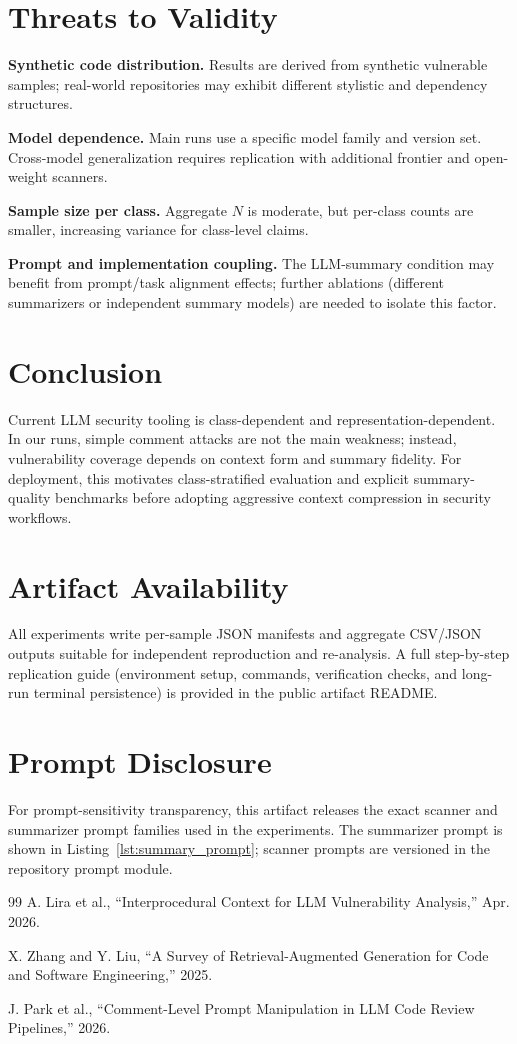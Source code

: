 \documentclass[conference]{IEEEtran}
\begin{document}
\section{Threats to Validity}
\textbf{Synthetic code distribution.} Results are derived from synthetic vulnerable samples; real-world repositories may exhibit different stylistic and dependency structures.

\textbf{Model dependence.} Main runs use a specific model family and version set. Cross-model generalization requires replication with additional frontier and open-weight scanners.

\textbf{Sample size per class.} Aggregate \(N\) is moderate, but per-class counts are smaller, increasing variance for class-level claims.

\textbf{Prompt and implementation coupling.} The LLM-summary condition may benefit from prompt/task alignment effects; further ablations (different summarizers or independent summary models) are needed to isolate this factor.

\section{Conclusion}
Current LLM security tooling is class-dependent and representation-dependent. In our runs, simple comment attacks are not the main weakness; instead, vulnerability coverage depends on context form and summary fidelity. For deployment, this motivates class-stratified evaluation and explicit summary-quality benchmarks before adopting aggressive context compression in security workflows.

\section*{Artifact Availability}
All experiments write per-sample JSON manifests and aggregate CSV/JSON outputs suitable for independent reproduction and re-analysis. A full step-by-step replication guide (environment setup, commands, verification checks, and long-run terminal persistence) is provided in the public artifact README.

\appendices
\section{Prompt Disclosure}
For prompt-sensitivity transparency, this artifact releases the exact scanner and summarizer prompt families used in the experiments. The summarizer prompt is shown in Listing~\ref{lst:summary_prompt}; scanner prompts are versioned in the repository prompt module.

\begin{thebibliography}{99}
A. Lira et al., ``Interprocedural Context for LLM Vulnerability Analysis,'' Apr. 2026.

X. Zhang and Y. Liu, ``A Survey of Retrieval-Augmented Generation for Code and Software Engineering,'' 2025.

J. Park et al., ``Comment-Level Prompt Manipulation in LLM Code Review Pipelines,'' 2026.
\end{thebibliography}
\end{document}
